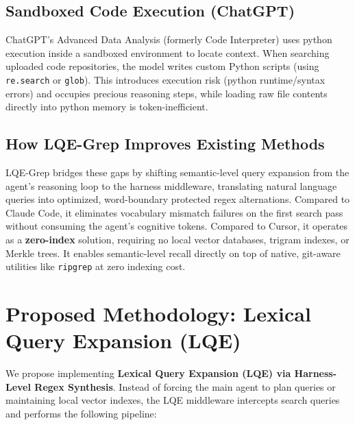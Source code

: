 \documentclass[11pt,a4paper]{article}
\begin{document}
\subsection{Sandboxed Code Execution (ChatGPT)}
ChatGPT's Advanced Data Analysis (formerly Code Interpreter) uses python execution inside a sandboxed environment to locate context. When searching uploaded code repositories, the model writes custom Python scripts (using \texttt{re.search} or \texttt{glob}). This introduces execution risk (python runtime/syntax errors) and occupies precious reasoning steps, while loading raw file contents directly into python memory is token-inefficient.

\subsection{How LQE-Grep Improves Existing Methods}
LQE-Grep bridges these gaps by shifting semantic-level query expansion from the agent's reasoning loop to the harness middleware, translating natural language queries into optimized, word-boundary protected regex alternations. Compared to Claude Code, it eliminates vocabulary mismatch failures on the first search pass without consuming the agent's cognitive tokens. Compared to Cursor, it operates as a \textbf{zero-index} solution, requiring no local vector databases, trigram indexes, or Merkle trees. It enables semantic-level recall directly on top of native, git-aware utilities like \texttt{ripgrep} at zero indexing cost.

\section{Proposed Methodology: Lexical Query Expansion (LQE)}
We propose implementing \textbf{Lexical Query Expansion (LQE) via Harness-Level Regex Synthesis}. Instead of forcing the main agent to plan queries or maintaining local vector indexes, the LQE middleware intercepts search queries and performs the following pipeline:
\end{document}
